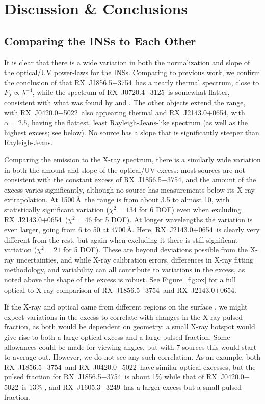 \documentclass[iop]{emulateapj}
\newcommand{\rxjw}{RX~J1856.5$-$3754}
\newcommand{\rxjk}{RX~J0720.4$-$3125}
\newcommand{\rbsb}{RX~J2143.0+0654}
\newcommand{\rxjvk}{RX~J1605.3+3249}
\newcommand{\rxjb}{RX~J0420.0$-$5022}
\begin{document}
\section{Discussion \& Conclusions}
\label{sec:disc}
\subsection{Comparing the INSs to Each Other}
It is clear that there is a wide variation in both the normalization
and slope of the optical/UV power-laws for the INSs.  Comparing  to
previous work, we confirm the conclusion of \citet{vkk01} that
\rxjw\ has a nearly thermal spectrum, close to $F_\lambda \propto
\lambda^{-4}$, while the spectrum of \rxjk\ is somewhat flatter,
consistent with what was found by \citet{kvkm+03} and \citet{mzh03}.
The other objects extend the range, with \rxjb\ also appearing thermal
and \rbsb, with $\alpha=2.5$, having the flattest, least
Rayleigh-Jeans-like spectrum (as well as the highest excess; see
below).  No source has a slope that is significantly steeper than
Rayleigh-Jeans.

Comparing the emission to the X-ray spectrum, there is a similarly
wide variation in both the amount and slope of the optical/UV excess:
most sources are not consistent with the constant excess of \rxjw, and
the amount of the excess varies significantly, although no source has
measurements below its X-ray extrapolation.  At 1500\,\AA\ the range
is from about 3.5 to almost 10, with statistically significant
variation ($\chi^2=134$ for 6 DOF) even when excluding
\rbsb\ ($\chi^2=46$ for 5 DOF).  At longer wavelengths the variation
is even larger, going from 6 to 50 at 4700\,\AA.  Here, \rbsb\ is
clearly very different from the rest, but again when excluding it
there is still significant variation ($\chi^2=21$ for 5 DOF).  These
are beyond deviations possible from the X-ray uncertainties, and while
X-ray calibration errors, differences in X-ray fitting methodology,
and variability can all contribute to variations in the excess, as
noted above the shape of the excess is robust.  See
Figure~\ref{fig:ox} for a full optical-to-X-ray comparison of
\rxjw\ and \rbsb.

If the X-ray and optical came from different regions on the surface
\citep{br02}, we might expect variations in the excess to correlate
with changes in the X-ray pulsed fraction, as both would be dependent
on geometry: a small X-ray hotspot would give rise to both a large
optical excess and a large pulsed fraction.  Some allowances could be
made for viewing angles, but with 7 sources this would start to
average out.  However, we do not see any such correlation.  As an
example, both \rxjw\ and \rxjb\ have similar optical excesses, but the
pulsed fraction for \rxjw\ is about 1\% \citep{tm07} while that of
\rxjb\ is 13\% \citep{hmz+04}, and \rxjvk\ has a larger excess but a
small pulsed fraction.
\end{document}
